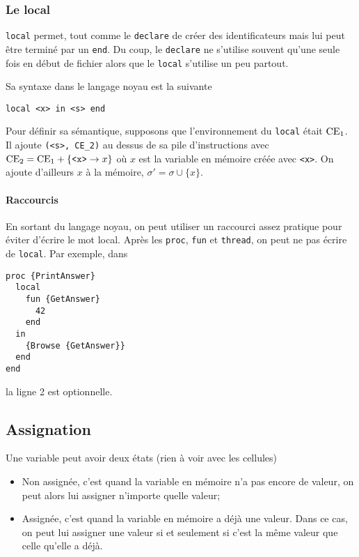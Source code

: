 \subsubsection{Le \keyword{} local}
\lstinline|local| permet, tout comme le \lstinline|declare| de créer
des identificateurs mais lui peut être terminé par un \lstinline|end|.
Du coup, le \lstinline|declare| ne s'utilise souvent qu'une seule fois en
début de fichier alors que le \lstinline|local| s'utilise un peu partout.

Sa syntaxe dans le langage noyau est la suivante
\begin{lstlisting}
local <x> in <s> end
\end{lstlisting}
Pour définir sa sémantique, supposons que l'environnement du \lstinline|local|
était $\mathrm{CE}_1$.
Il ajoute \lstinline|(<s>, CE_2)| au dessus de sa pile d'instructions avec
$\ce_2 = \ce_1 + \{\verb|<x>| \to x\}$ où
$x$ est la variable en mémoire créée avec
\lstinline|<x>|.
On ajoute d'ailleurs $x$ à la mémoire, $\sigma' = \sigma \cup \{x\}$.

\paragraph{Raccourcis}
En sortant du langage noyau,
on peut utiliser un raccourci assez pratique pour éviter
d'écrire le mot local.
Après les \keywords{} \lstinline|proc|, \lstinline|fun| et
\lstinline|thread|, on peut ne pas écrire de \lstinline|local|.
Par exemple, dans
\begin{lstlisting}
proc {PrintAnswer}
  local
    fun {GetAnswer}
      42
    end
  in
    {Browse {GetAnswer}}
  end
end
\end{lstlisting}
la ligne 2 est optionnelle.

\subsection{Assignation}
Une variable peut avoir deux états (rien à voir avec les cellules)
\begin{itemize}
  \item Non assignée, c'est quand la variable en mémoire n'a pas encore
    de valeur, on peut alors lui assigner n'importe quelle valeur;
  \item Assignée, c'est quand la variable en mémoire a déjà une valeur.
    Dans ce cas, on peut lui assigner une valeur si et seulement si
    c'est la même valeur que celle qu'elle a déjà.
\end{itemize}

